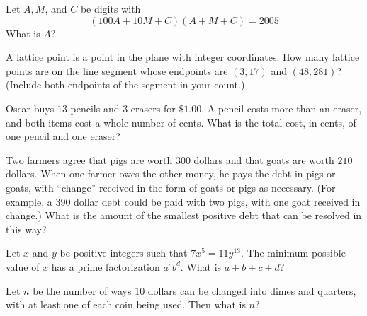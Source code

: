 \documentclass[mast]{lucky}
\begin{document}
\begin{prob}[AMC 12A 2005/8]{2}

Let $A,M$, and $C$ be digits with
\[(100A+10M+C)(A+M+C) = 2005\]
What is $A$?

\end{prob}

\begin{prob}[AHSME 1989/16]{2}

A lattice point is a point in the plane with integer coordinates. How many lattice points are on the line segment whose endpoints are $(3,17)$ and $(48,281)$? (Include both endpoints of the segment in your count.)

\end{prob}

\begin{prob}[AMC 12A 2006/9]{2}

Oscar buys $13$ pencils and $3$ erasers for $\$1.00$. A pencil costs more than an eraser, and both items cost a whole number of cents. What is the total cost, in cents, of one pencil and one eraser?

\end{prob}

\begin{prob}[AMC 12A 2006/14]{3}

Two farmers agree that pigs are worth $300$ dollars and that goats are worth $210$ dollars. When one farmer owes the other money, he pays the debt in pigs or goats, with ``change'' received in the form of goats or pigs as necessary. (For example, a $390$ dollar debt could be paid with two pigs, with one goat received in change.) What is the amount of the smallest positive debt that can be resolved in this way?

\end{prob}

\begin{prob}[AMC 12B 2003/18]{3}

Let $x$ and $y$ be positive integers such that $7x^5=11y^{13}$. The minimum possible value of $x$ has a prime factorization $a^c b^d$. What is $a+b+c+d$?

\end{prob}

\begin{prob}[AHSME 1968/19]{3}

Let $n$ be the number of ways $10$ dollars can be changed into dimes and quarters, with at least one of each coin being used. Then what is $n$?

\end{prob}
\end{document}
